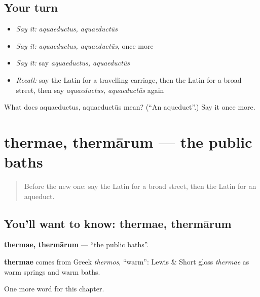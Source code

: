 \subsection*{Your turn}
\begin{itemize}
\raggedright
  \item \emph{Say it:} \emph{aquaeductus, aquaeductūs}
  \item \emph{Say it:} \emph{aquaeductus, aquaeductūs}, once more
  \item \emph{Say it:} say \emph{aquaeductus, aquaeductūs}
  \item \emph{Recall:} say the Latin for a travelling carriage, then the Latin for a broad street, then say \emph{aquaeductus, aquaeductūs} again
\end{itemize}

\begin{tcolorbox}[breakable,colback=teal!4,colframe=teal!35!black,title={Before you move on}]
What does aquaeductus, aquaeductūs mean? (\textquotedblleft{}An aqueduct\textquotedblright{}.) Say it once more.
\end{tcolorbox}
\section[thermae, thermārum]{thermae, thermārum — the public baths}

\label{lesson:LA-C244-thermae}



\begin{quote}
Before the new one: say the Latin for a broad street, then the Latin for an aqueduct.
\end{quote}

\subsection*{You'll want to know: thermae, thermārum}
\textbf{thermae, thermārum} — \textquotedblleft{}the public baths\textquotedblright{}.

\begin{cousinweb}
\textbf{thermae} comes from Greek \emph{thermos}, \textquotedblleft{}warm\textquotedblright{}: Lewis \& Short gloss \emph{thermae} as warm springs and warm baths.
\end{cousinweb}

\begin{grammarlens}[title={What you've built}]
One more word for this chapter.
\end{grammarlens}

